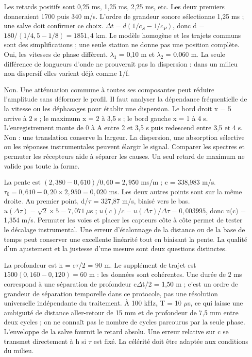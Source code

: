 Les retards positifs sont 0,25 ms, 1,25 ms, 2,25 ms, etc. Les deux premiers donneraient 1700 puis 340 m/s. L’ordre de grandeur sonore sélectionne 1,25 ms ; une salve doit confirmer ce choix.
$\Delta t=d(1/c_S-1/c_P)$, donc d = $180/(1/4{,}5-1/8)=1851{,}4$ km. Le modèle homogène et les trajets communs sont des simplifications ; une seule station ne donne pas une position complète.
Oui, les vitesses de phase diffèrent. \ensuremath{\lambda_1} = 0,10 m et \ensuremath{\lambda_2} = 0,060 m. La seule différence de longueurs d’onde ne prouverait pas la dispersion : dans un milieu non dispersif elles varient déjà comme 1/f.


Non. Une atténuation commune à toutes ses composantes peut réduire l’amplitude sans déformer le profil. Il faut analyser la dépendance fréquentielle de la vitesse ou les déphasages pour établir une dispersion.
Le bord droit x = 5 arrive à 2 s ; le maximum x = 2 à 3,5 s ; le bord gauche x = 1 à 4 s. L’enregistrement monte de 0 à A entre 2 et 3,5 s puis redescend entre 3,5 et 4 s.
Non : une translation conserve la largeur. La dispersion, une absorption sélective ou les réponses instrumentales peuvent élargir le signal. Comparer les spectres et permuter les récepteurs aide à séparer les causes. Un seul retard de maximum ne valide pas toute la forme.


La pente est $(2{,}380-0{,}610)/0{,}60=2{,}950$ ms/m ; c = 338,983 m/s. $\tau_0=0{,}610-0{,}20\times2{,}950=0{,}020$ ms. Les deux autres points sont sur la même droite. Au premier point, d/\ensuremath{\tau} = 327,87 m/s, biaisé vers le bas. $u(\Delta\tau)=\sqrt2\times5=7{,}071\ \mu$s ; $u(c)/c=u(\Delta\tau)/\Delta\tau=0{,}003995$, donc u(c) = 1,354 m/s. Permuter les voies et placer les capteurs côte à côte permet de tester le décalage instrumental. Une erreur d’étalonnage de la distance ou de la base de temps peut conserver une excellente linéarité tout en biaisant la pente. La qualité d’un ajustement et la justesse d’une mesure sont deux questions distinctes.

La profondeur est h = c\ensuremath{\tau}/2 = 90 m. Le supplément de trajet est $1500(0{,}160-0{,}120)=60$ m : les données sont cohérentes. Une durée de 2 ms correspond à une séparation de profondeur c\ensuremath{\Delta}t/2 = 1,50 m ; c’est un ordre de grandeur de séparation temporelle dans ce protocole, pas une résolution universelle indépendante du traitement. À 100 kHz, T = 10 \ensuremath{\mu}s, ce qui laisse une ambiguïté de distance aller-retour de 15 mm et de profondeur de 7,5 mm entre deux cycles ; on ne connaît pas le nombre de cycles parcourus par la seule phase. L’enveloppe de la salve fournit le retard absolu. Une erreur relative sur c se transmet directement à h si \ensuremath{\tau} est fixé. La célérité doit être adaptée aux conditions du milieu.

